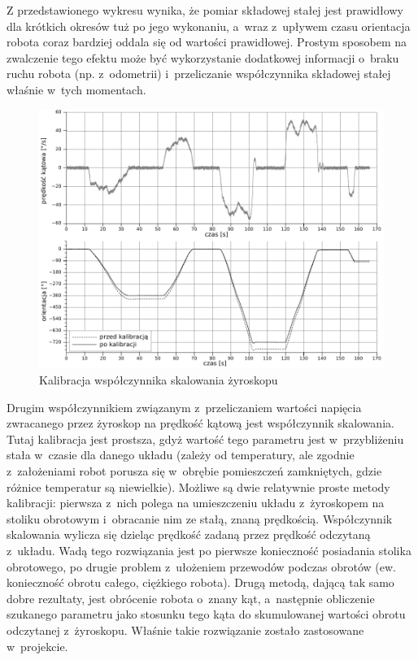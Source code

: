 Z przedstawionego wykresu wynika, że pomiar składowej stałej jest prawidłowy dla
krótkich okresów tuż po jego wykonaniu, a~wraz z~upływem czasu orientacja
robota coraz bardziej oddala się od wartości prawidłowej. Prostym sposobem na
zwalczenie tego efektu może być wykorzystanie dodatkowej informacji o~braku
ruchu robota (np. z~odometrii) i~przeliczanie współczynnika składowej stałej
właśnie w~tych momentach.

\begin{figure}[ht!]
\centering
\includegraphics[width=\textwidth]{../../Common/pomiary/gyro_rot_bw}
\caption{Kalibracja współczynnika skalowania żyroskopu}
\label{fig:gyro_rot}
\end{figure}

Drugim współczynnikiem związanym z~przeliczaniem wartości napięcia zwracanego
przez żyroskop na prędkość kątową jest współczynnik skalowania. Tutaj kalibracja
jest prostsza, gdyż wartość tego parametru jest w~przybliżeniu stała w~czasie
dla danego układu (zależy od temperatury, ale zgodnie z~założeniami robot
porusza się w~obrębie pomieszczeń zamkniętych, gdzie różnice temperatur są
niewielkie). Możliwe są dwie relatywnie proste metody kalibracji: pierwsza 
z~nich polega na umieszczeniu układu z~żyroskopem na stoliku obrotowym i~obracanie
nim ze stałą, znaną prędkością. Współczynnik skalowania wylicza się dzieląc
prędkość zadaną przez prędkość odczytaną z~układu. Wadą tego rozwiązania jest po
pierwsze konieczność posiadania stolika obrotowego, po drugie problem 
z~ułożeniem przewodów podczas obrotów (ew. konieczność obrotu całego, ciężkiego
robota). Drugą metodą, dającą tak samo dobre rezultaty, jest obrócenie robota 
o~znany kąt, a~następnie obliczenie szukanego parametru jako stosunku tego kąta do
skumulowanej wartości obrotu odczytanej z~żyroskopu. Właśnie takie rozwiązanie
zostało zastosowane w~projekcie.

